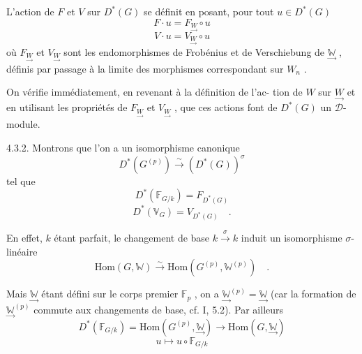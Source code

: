 
L'action de $F$ et $V$ sur $D^*(G)$ se définit en posant,
pour tout $u \in D^*(G)$
\[ F\cdot u = F_{\underset{\rightarrow}{W}} \circ u \]
\[ V\cdot u = V_{\underset{\rightarrow}{W}} \circ u \]
où $F_{\underset{\rightarrow}{W}}$ et $V_{\underset{\rightarrow}{W}}$ sont les endomorphismes de Frobénius et de Verschiebung
 de $\underset{\rightarrow}{\mathbb{W}}$ , définis par passage à la limite des morphismes correspondant sur  $W_n$ .

On vérifie immédiatement, en revenant à la définition de l'ac-%
tion de $W$ sur $\underset{\rightarrow}{W}$ et en utilisant les propriétés de $F_{\underset{\rightarrow}{W}}$ et $V_{\underset{\rightarrow}{W}}$ , que
ces actions font de $D^*(G)$ un $\mathcal{D}$-module.

4.3.2. Montrons que l'on a un isomorphisme canonique
\[ D^*(G^{(p)}) \overset{\sim}{\rightarrow} (D^*(G))^{\sigma} \]
tel que
\[ D^*(\mathbb{F}_{G/k}) = F_{D^*(G)} \]
\[ D^*(\mathbb{V}_{G}) = V_{D^*(G)} \quad . \]

En effet, $k$ étant parfait, le changement de base $k \overset{\sigma}{\rightarrow} k$
induit un isomorphisme $\sigma$-linéaire
\[ \mathrm{Hom}(G, \mathbb{W}) \overset{\sim}{\rightarrow} \mathrm{Hom}(G^{(p)}, \mathbb{W}^{(p)}) \quad . \]

Mais $\underset{\rightarrow}{\mathbb{W}}$ étant défini sur le corps premier $\mathbb{F}_p$ , on a $\underset{\rightarrow}{\mathbb{W}}^{(p)} = \underset{\rightarrow}{\mathbb{W}}$
(car la formation de $\underset{\rightarrow}{\mathbb{W}}^{(p)}$ commute aux changements de base, cf. I, 5.2).
Par ailleurs
\[ D^*(\mathbb{F}_{G/k}) = \mathrm{Hom}(G^{(p)}, \underset{\rightarrow}{\mathbb{W}}) \rightarrow \mathrm{Hom}(G, \underset{\rightarrow}{\mathbb{W}}) \]
\margin{$\times$ \quad $\mapsto$}
\[ u \mapsto u \circ \mathbb{F}_{G/k} \]


